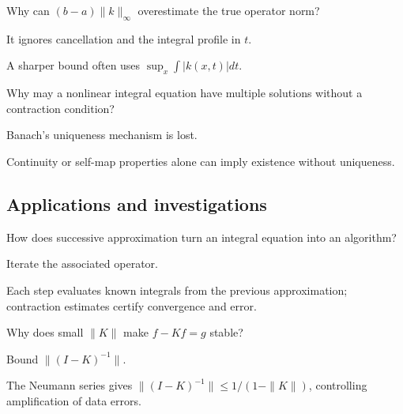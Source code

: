 \begin{exercise}\label{exr:ii18-expand-11}
Why can \((b-a)\|k\|_\infty\) overestimate the true operator norm?
\end{exercise}
\begin{hint}
It ignores cancellation and the integral profile in \(t\).
\end{hint}
\begin{solution}
A sharper bound often uses \(\sup_x\int|k(x,t)|dt\).
\end{solution}

\begin{exercise}\label{exr:ii18-expand-12}
Why may a nonlinear integral equation have multiple solutions without a contraction condition?
\end{exercise}
\begin{hint}
Banach's uniqueness mechanism is lost.
\end{hint}
\begin{solution}
Continuity or self-map properties alone can imply existence without uniqueness.
\end{solution}

\subsection*{Applications and investigations}

\begin{exercise}\label{exr:ii18-expand-13}
How does successive approximation turn an integral equation into an algorithm?
\end{exercise}
\begin{hint}
Iterate the associated operator.
\end{hint}
\begin{solution}
Each step evaluates known integrals from the previous approximation; contraction estimates certify convergence and error.
\end{solution}

\begin{exercise}\label{exr:ii18-expand-14}
Why does small \(\|K\|\) make \(f-Kf=g\) stable?
\end{exercise}
\begin{hint}
Bound \(\|(I-K)^{-1}\|\).
\end{hint}
\begin{solution}
The Neumann series gives \(\|(I-K)^{-1}\|\le1/(1-\|K\|)\), controlling amplification of data errors.
\end{solution}

